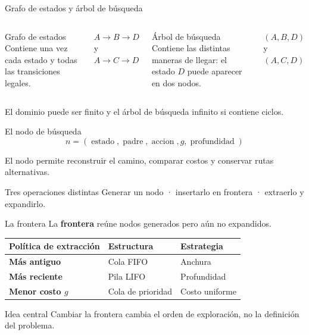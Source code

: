 \documentclass[aspectratio=169,11pt]{beamer}
\newcommand{\concepto}[1]{\textcolor{UAPTeal}{\textbf{#1}}}
\begin{document}
\begin{frame}{Grafo de estados y árbol de búsqueda}
  \begin{columns}[c]
      \begin{block}{Grafo de estados}
        Contiene una vez cada estado y todas las transiciones legales.
      \end{block}
      \centering $A\rightarrow B\rightarrow D$\quad y\quad $A\rightarrow C\rightarrow D$
      \begin{block}{Árbol de búsqueda}
        Contiene las distintas maneras de llegar: el estado $D$ puede aparecer en dos nodos.
      \end{block}
      \centering $(A,B,D)$\quad y\quad $(A,C,D)$
  \end{columns}
  \vfill
  \alert{El dominio puede ser finito y el árbol de búsqueda infinito si contiene ciclos.}
\end{frame}

\begin{frame}{El nodo de búsqueda}
  \[
    n=(\operatorname{estado},\operatorname{padre},\operatorname{accion},g,\operatorname{profundidad})
  \]
  \centering
  \vfill
  El nodo permite reconstruir el camino, comparar costos y conservar rutas alternativas.
  \begin{block}{Tres operaciones distintas}
    Generar un nodo · insertarlo en frontera · extraerlo y expandirlo.
  \end{block}
\end{frame}

\begin{frame}{La frontera}
  La \concepto{frontera} reúne nodos generados pero aún no expandidos.
  \small
  \begin{tabularx}{\textwidth}{>{\bfseries}p{}p{}X}
    \toprule
    Política de extracción & Estructura & Estrategia \\\midrule
    Más antiguo & Cola FIFO & Anchura \\
    Más reciente & Pila LIFO & Profundidad \\
    Menor costo $g$ & Cola de prioridad & Costo uniforme \\
    \bottomrule
  \end{tabularx}
  \vfill
  \begin{block}{Idea central}
    Cambiar la frontera cambia el orden de exploración, no la definición del problema.
  \end{block}
\end{frame}
\end{document}
